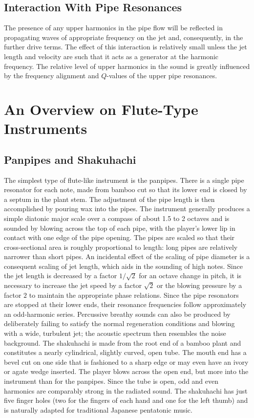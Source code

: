 \subsection{Interaction With Pipe Resonances}

The presence of any upper harmonics in the pipe flow will be reflected in propagating waves of appropriate frequency on the jet and, consequently, in the further drive terms. The effect of this interaction is relatively small unless the jet length and velocity are such that it acts as a generator at the harmonic frequency. The relative level of upper harmonics in the sound is greatly influenced by the frequency alignment and \(Q\)-values of the upper pipe resonances.

\section{An Overview on Flute-Type Instruments}

\subsection{Panpipes and Shakuhachi}

The simplest type of flute-like instrument is the panpipes. There is a single pipe resonator for each note, made from bamboo cut so that its lower end is closed by a septum in the plant stem. The adjustment of the pipe length is then accomplished by pouring wax into the pipes. The instrument generally produces a simple diatonic major scale over a compass of about 1.5 to 2 octaves and is sounded by blowing across the top of each pipe, with the player's lower lip in contact with one edge of the pipe opening. The pipes are scaled so that their cross-sectional area is roughly proportional to length: long pipes are relatively narrower than short pipes. An incidental effect of the scaling of pipe diameter is a consequent scaling of jet length, which aids in the sounding of high notes. Since the jet length is decreased by a factor \(1/\sqrt{2}\) for an octave change in pitch, it is necessary to increase the jet speed by a factor \(\sqrt{2}\) or the blowing pressure by a factor \(2\) to maintain the appropriate phase relations. Since the pipe resonators are stopped at their lower ends, their resonance frequencies follow approximately an odd-harmonic series. Percussive breathy sounds can also be produced by deliberately failing to satisfy the normal regeneration conditions and blowing with a wide, turbulent jet; the acoustic spectrum then resembles the noise background. The shakuhachi is made from the root end of a bamboo plant and constitutes a nearly cylindrical, slightly curved, open tube. The mouth end has a bevel cut on one side that is fashioned to a sharp edge or may even have an ivory or agate wedge inserted. The player blows across the open end, but more into the instrument than for the panpipes. Since the tube is open, odd and even harmonics are comparably strong in the radiated sound. The shakuhachi has just five finger holes (two for the fingers of each hand and one for the left thumb) and is naturally adapted for traditional Japanese pentatonic music.

